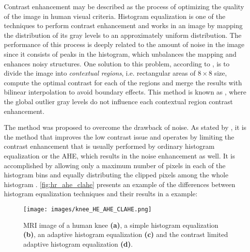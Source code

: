 Contrast enhancement may be described as the process of optimizing the quality of the image in human visual criteria. Histogram equalization is one of the techniques to perform contrast enhancement and works in an image by mapping the distribution of its gray levels to an approximately uniform distribution. The performance of this process is deeply related to the amount of noise in the image since it consists of peaks in the histogram, which unbalances the mapping and enhances noisy structures. One solution to this problem, according to , is to divide the image into \emph{contextual regions}, i.e. rectangular areas of $8 \times 8$ size, compute the optimal contrast for each of the regions and merge the results with bilinear interpolation to avoid boundary effects. This method is known as , where the global outlier gray levels do not influence each contextual region contrast enhancement.

The  method was proposed to overcome the drawback of noise. As stated by , it is the method that improves the low contrast issue and operates by limiting the contrast enhancement that is usually performed by ordinary histogram equalization or the AHE, which results in the noise enhancement as well. It is accomplished by allowing only a maximum number of pixels in each of the histogram bins and equally distributing the clipped pixels among the whole histogram \cite{zuiderveld1994constrast}. \autoref{fig:hr_ahe_clahe} presents an example of the differences between histogram equalization techniques and their results in a  example:

\begin{figure}[htb]
	\caption{\label{fig:hr_ahe_clahe} MRI image of a human knee \textbf{(a)}, a simple histogram equalization \textbf{(b)}, an adaptive histogram equalization \textbf{(c)} and the contrast limited adaptive histogram equalization \textbf{(d)}.} 
	\begin{center}
	    \texttt{[image: images/knee\_HE\_AHE\_CLAHE.png]}
	\end{center}
	\centering
\end{figure}
